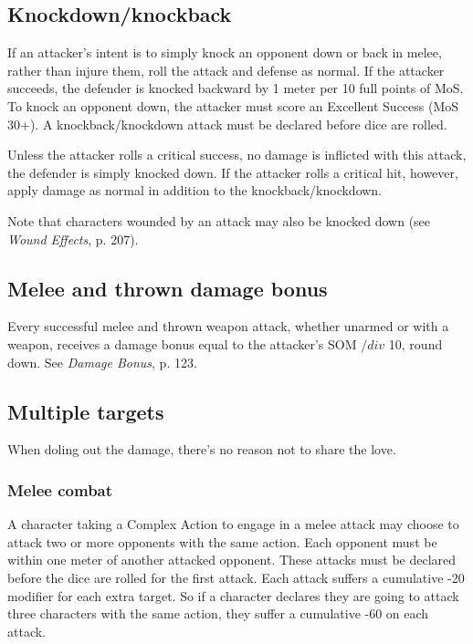 \subsection{Knockdown/knockback}
\label{sec:knockdown-knockback}

If an attacker’s intent is to simply knock an opponent down or back in melee, rather than injure them, roll the attack and defense as normal. If the attacker succeeds, the defender is knocked backward by 1 meter per 10 full points of MoS. To knock an opponent down, the attacker must score an Excellent Success (MoS 30+). A knockback/knockdown attack must be declared before dice are rolled.

Unless the attacker rolls a critical success, no damage is inflicted with this attack, the defender is simply knocked down. If the attacker rolls a critical hit, however, apply damage as normal in addition to the knockback/knockdown.

Note that characters wounded by an attack may also be knocked down (see \emph{Wound Effects}, p. 207).


\subsection{Melee and thrown damage bonus}
\label{sec:melee-thrown-damage-bonus}

Every successful melee and thrown weapon attack, whether unarmed or with a weapon, receives a damage bonus equal to the attacker’s SOM $/div$ 10, round down. See \emph{Damage Bonus}, p. 123.


\subsection{Multiple targets}
\label{sec:multiple-targets}

When doling out the damage, there’s no reason not to share the love.

\subsubsection{Melee combat}

A character taking a Complex Action to engage in a melee attack may choose to attack two or more opponents with the same action. Each opponent must be within one meter of another attacked opponent. These attacks must be declared before the dice are rolled for the first attack. Each attack suffers a cumulative -20 modifier for each extra target. So if a character declares they are going to attack three characters with the same action, they suffer a cumulative -60 on each attack.

